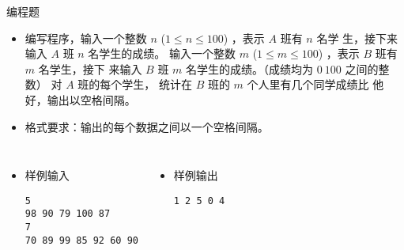 \begin{frame}[fragile]
{{\begin{itemize}
            \end{itemize}

        }{
            \begin{exampleblock}{编程题}

                \begin{itemize}
                    \item 编写程序，输入一个整数 $n$ ($1 \le n \le 100$) ，表示 $A$ 班有 $n$ 名学
                    生，接下来输入 $A$ 班 $n$ 名学生的成绩。
                    输入一个整数 $m$ ($1 \le m \le 100$) ，表示 $B$ 班有 $m$ 名学生，接下
                    来输入 $B$ 班 $m$ 名学生的成绩。（成绩均为 $0~100$ 之间的整数）
                    对 $A$ 班的每个学生， 统计在 $B$ 班的 $m$ 个人里有几个同学成绩比
                    他好，输出以空格间隔。
                    
                    \item 格式要求：输出的每个数据之间以一个空格间隔。
                \end{itemize}

                \begin{columns}[onlytextwidth,T]
    

                        \begin{itemize}
                            \item 样例输入
    
                            \lstinline|5|\\
                            \lstinline|98 90 79 100 87|\\
                            \lstinline|7|\\
                            \lstinline|70 89 99 85 92 60 90|

                        \end{itemize}


                        \begin{itemize}
                            \item 样例输出
                            
                            \lstinline|1 2 5 0 4|

                        \end{itemize}
                        
                \end{columns}
        
            \end{exampleblock}
        }
    }

\end{frame}


